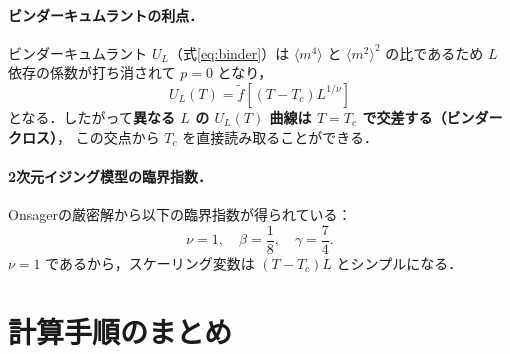 \documentclass[12pt,a4paper]{ltjsarticle}
\begin{document}
\paragraph{ビンダーキュムラントの利点．}
ビンダーキュムラント $U_L$（式\eqref{eq:binder}）は $\langle m^4\rangle$ と $\langle m^2\rangle^2$ の比であるため
$L$ 依存の係数が打ち消されて $p = 0$ となり，
\begin{equation}
  U_L(T) = \tilde{f}\!\left[(T - T_c) L^{1/\nu}\right]
\end{equation}
となる．したがって\textbf{異なる $L$ の $U_L(T)$ 曲線は $T = T_c$ で交差する（ビンダークロス）}，
この交点から $T_c$ を直接読み取ることができる．

\paragraph{2次元イジング模型の臨界指数．}
Onsagerの厳密解から以下の臨界指数が得られている：
\begin{equation}
  \nu = 1,\quad \beta = \frac{1}{8},\quad \gamma = \frac{7}{4}.
\end{equation}
$\nu = 1$ であるから，スケーリング変数は $(T - T_c)L$ とシンプルになる．


\section{計算手順のまとめ}
\end{document}
